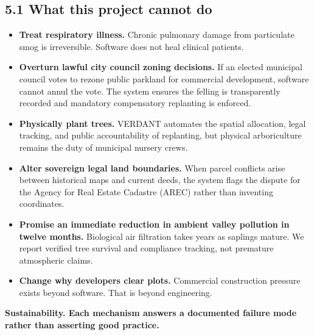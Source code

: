 \documentclass[9pt,a4paper]{article}
\begin{document}
\vspace{0.15em}
\subsection*{5.1 What this project cannot do}
\begin{itemize}[leftmargin=1.4em, itemsep=0.03em]
  \item \textbf{Treat respiratory illness.} Chronic pulmonary damage from particulate smog is irreversible. Software does not heal clinical patients.
  \item \textbf{Overturn lawful city council zoning decisions.} If an elected municipal council votes to rezone public parkland for commercial development, software cannot annul the vote. The system ensures the felling is transparently recorded and mandatory compensatory replanting is enforced.
  \item \textbf{Physically plant trees.} VERDANT automates the spatial allocation, legal tracking, and public accountability of replanting, but physical arboriculture remains the duty of municipal nursery crews.
  \item \textbf{Alter sovereign legal land boundaries.} When parcel conflicts arise between historical maps and current deeds, the system flags the dispute for the Agency for Real Estate Cadastre (AREC) rather than inventing coordinates.
  \item \textbf{Promise an immediate reduction in ambient valley pollution in twelve months.} Biological air filtration takes years as saplings mature. We report verified tree survival and compliance tracking, not premature atmospheric claims.
  \item \textbf{Change why developers clear plots.} Commercial construction pressure exists beyond software. That is beyond engineering.
\end{itemize}

\clearpage

\textbf{Sustainability. Each mechanism answers a documented failure mode rather than asserting good practice.}
\vspace{0.1em}
\end{document}
